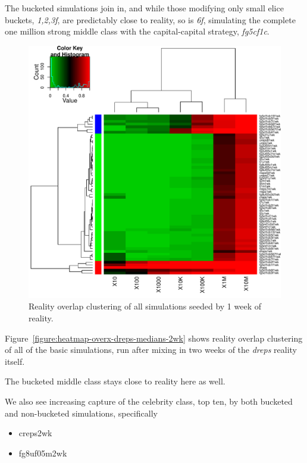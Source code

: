 \documentclass[10pt,oneside]{memoir}
\begin{document}
The bucketed simulations join in, and while those modifying only small elice buckets, {\itshape {1,2,3}f}, are predictably close to reality, so is {\itshape 6f}, simulating the complete one million strong middle class with the capital-capital strategy, {\itshape fg5cf1c}.



\begin{figure}
\begin{center}
    \includegraphics{figures/heatmap-overx-dreps-medians-1wk}
    \caption{Reality overlap clustering of all simulations seeded by 1 week of reality.}
    \label{figure:heatmap-overx-dreps-medians-1wk}
\end{center}
\end{figure}
Figure~\ref{figure:heatmap-overx-dreps-medians-2wk} shows reality overlap clustering of all of the basic simulations, run after mixing in two weeks of the {\itshape dreps} reality itself.


The bucketed middle class stays close to reality here as well.


We also see increasing capture of the celebrity class, top ten, by both bucketed and non-bucketed simulations, specifically


\begin{itemize}


\item creps2wk

\item fg8uf05m2wk
\end{itemize}
\end{document}
